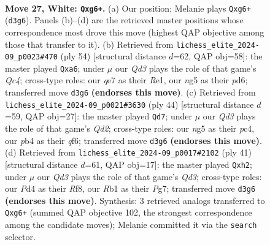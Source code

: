 \documentclass[11pt]{article}
\begin{document}
\clearpage

\begin{figure}[p]\centering
\begin{subfigure}{0.46\textwidth}\centering
\resizebox{\linewidth}{!}{%
\newchessgame
\chessboard[
  setfen={4r1k1/p1ppq3/5pp1/6n1/1pPP4/P2Q4/2P2P1P/1R4K1 w - - 0 27},
  showmover=false,
  pgfstyle=straightmove, color=movearrow, markmove={d3-g6}
]}
\caption{}
\end{subfigure}\hfill
\begin{subfigure}{0.46\textwidth}\centering
\resizebox{\linewidth}{!}{%
\newchessgame
\chessboard[
  setfen={4r3/3q2kp/p2p2p1/5p2/2Q1P3/3P4/PP4PP/4R1K1 w - - 1 28},
  showmover=false,
  pgfstyle=straightmove, color=movearrow, markmove={c4-a6}
]}
\caption{}
\end{subfigure}
\\[4pt]
\begin{subfigure}{0.46\textwidth}\centering
\resizebox{\linewidth}{!}{%
\newchessgame
\chessboard[
  setfen={r5k1/pp4p1/4Pq1p/5p2/2p5/8/PP1Q1PPP/4R1K1 w - - 2 23},
  showmover=false,
  pgfstyle=straightmove, color=movearrow, markmove={d2-d7}
]}
\caption{}
\end{subfigure}\hfill
\begin{subfigure}{0.46\textwidth}\centering
\resizebox{\linewidth}{!}{%
\newchessgame
\chessboard[
  setfen={5rk1/p2p2pp/3qp3/3p4/8/P3B3/1P2Q1PP/R3K3 b - - 1 21},
  showmover=false,
  pgfstyle=straightmove, color=movearrow, markmove={d6-h2}
]}
\caption{}
\end{subfigure}
\caption{\textbf{Move 27, White: \texttt{Qxg6+}.} (a) Our position; Melanie plays \texttt{Qxg6+} (\texttt{d3g6}). Panels (b)--(d) are the retrieved master positions whose correspondence most drove this move (highest QAP objective among those that transfer to it). (b) Retrieved from \texttt{lichess\_elite\_2024-09\_p0023\#470} (ply 54) [structural distance $d$=62, QAP obj=58]: the master played \texttt{Qxa6}; under $\mu$ our \emph{Qd3} plays the role of that game's \emph{Qc4}; cross-type roles: our \emph{q}e7 as their \emph{R}e1, our \emph{n}g5 as their \emph{p}d6; transferred move \texttt{d3g6} \textbf{(endorses this move)}. (c) Retrieved from \texttt{lichess\_elite\_2024-09\_p0021\#3630} (ply 44) [structural distance $d$=59, QAP obj=27]: the master played \texttt{Qd7}; under $\mu$ our \emph{Qd3} plays the role of that game's \emph{Qd2}; cross-type roles: our \emph{n}g5 as their \emph{p}c4, our \emph{p}b4 as their \emph{q}f6; transferred move \texttt{d3g6} \textbf{(endorses this move)}. (d) Retrieved from \texttt{lichess\_elite\_2024-09\_p0017\#2102} (ply 41) [structural distance $d$=61, QAP obj=17]: the master played \texttt{Qxh2}; under $\mu$ our \emph{Qd3} plays the role of that game's \emph{Qd3}; cross-type roles: our \emph{P}d4 as their \emph{R}f8, our \emph{R}b1 as their \emph{P}g7; transferred move \texttt{d3g6} \textbf{(endorses this move)}. Synthesis: 3 retrieved analogs transferred to \texttt{Qxg6+} (summed QAP objective 102, the strongest correspondence among the candidate moves); Melanie committed it via the \texttt{search} selector.}
\label{fig:thought-m52}
\end{figure}
\end{document}
